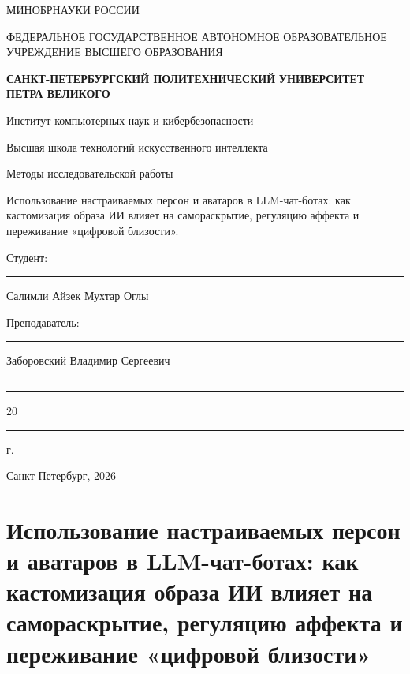 \documentclass[areasetadvanced]{scrartcl}
\begin{document}
\sloppy
	\thispagestyle{empty}
	\begin{center}
		\large{МИНОБРНАУКИ РОССИИ} \par
		\vspace{0.3cm}
		\normalsize
		{ФЕДЕРАЛЬНОЕ ГОСУДАРСТВЕННОЕ АВТОНОМНОЕ ОБРАЗОВАТЕЛЬНОЕ УЧРЕЖДЕНИЕ ВЫСШЕГО ОБРАЗОВАНИЯ} \par
		\vspace{0.3cm}
		\textbf{САНКТ-ПЕТЕРБУРГСКИЙ ПОЛИТЕХНИЧЕСКИЙ}
		\textbf{УНИВЕРСИТЕТ ПЕТРА ВЕЛИКОГО} \par
		\vspace{0.3cm}
		{Институт компьютерных наук и кибербезопасности}\par
		{Высшая школа технологий искусственного интеллекта}\par
	\end{center}
	\vfill
	\begin{center}
        \par
		{\huge Методы исследовательской работы}\par
        \Large {Использование настраиваемых персон и аватаров в LLM-чат-ботах:
как кастомизация образа ИИ влияет на самораскрытие, регуляцию аффекта
и переживание «цифровой близости».}\par
	\end{center}
	\vfill
	\begin{flushleft}
		Студент: \hspace{1.8cm} \rule[0pt]{2.5cm}{0.5pt}\hfill Салимли Айзек Мухтар Оглы\par
		\vspace{1.5cm}
		Преподаватель: \hspace{0.55cm} \rule[0pt]{2.5cm}{0.5pt}\hfill  Заборовский Владимир Сергеевич
	\end{flushleft}
	\vspace{0.5cm}
	\begin{flushright}
		\guillemotleft \rule[0pt]{0.8cm}{0.5pt}\guillemotright \rule[0pt]{2cm}{0.5pt} 20\rule[0pt]{0.5cm}{0.5pt} г.
	\end{flushright}
	\vfill
	\begin{center}
		Санкт-Петербург, 2026
	\end{center}
	\newpage
	\tableofcontents
  \newpage
  \section{Использование настраиваемых персон и аватаров в LLM-чат-ботах:
как кастомизация образа ИИ влияет на самораскрытие, регуляцию аффекта
и переживание «цифровой близости»}
\end{document}
